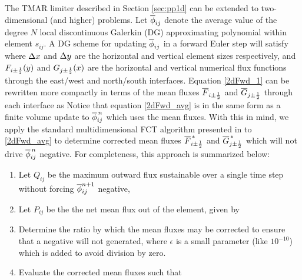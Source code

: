 \documentclass{ametsoc}
\begin{document}
The TMAR limiter described in Section \ref{sec:pp1d} can be extended to two-dimensional (and higher) problems. Let $\overline{\phi}_{ij}$ denote the average value of the degree $N$ local discontinuous Galerkin (DG) approximating polynomial within element $s_{ij}$. A DG scheme for updating $\overline{\phi}_{ij}$ in a forward Euler step will satisfy
where $\Delta x$ and $\Delta y$ are the horizontal and vertical element sizes respectively, and $F_{i\pm\frac{1}{2}}(y)$ and $G_{j\pm\frac{1}{2}}(x)$ are the horizontal and vertical numerical flux functions through the east/west and north/south interfaces. Equation \eqref{2dFwd_1} can be rewritten more compactly in terms of the mean fluxes $\overline{F}_{i\pm \frac{1}{2}}$ and $\overline{G}_{j\pm \frac{1}{2}}$ through each interface as 
Notice that equation \eqref{2dFwd_avg} is in the same form as a finite volume update to $\overline{\phi}_{ij}^{\,n}$ which uses the mean fluxes. With this in mind, we apply the standard multidimensional FCT algorithm presented in \citet{Zalesak:1979aa} to \eqref{2dFwd_avg} to determine corrected mean fluxes $\overline{F}_{i\pm\frac{1}{2}}^{\,*}$ and $\overline{G}_{j\pm\frac{1}{2}}^{\,*}$ which will not drive $\overline{\phi}_{ij}^{\,n}$ negative. For completeness, this approach is summarized below:
\begin{enumerate}
\item Let $Q_{ij}$ be the maximum outward flux sustainable over a single time step without forcing $\overline{\phi}_{ij}^{n+1}$ negative,
\item Let $P_{ij}$ be the the net mean flux out of the element, given by
\item Determine the ratio by which the mean fluxes may be corrected to ensure that a negative will not generated,
where $\epsilon$ is a small parameter (like $10^{-10}$) which is added to avoid division by zero.
\item Evaluate the corrected mean fluxes such that
\end{enumerate}
\end{document}
